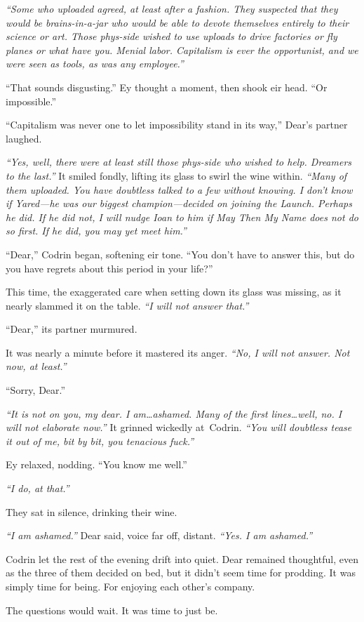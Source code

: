 \emph{``Some who uploaded agreed, at least after a fashion. They suspected that they would be brains-in-a-jar who would be able to devote themselves entirely to their science or art. Those phys-side wished to use uploads to drive factories or fly planes or what have you. Menial labor. Capitalism is ever the opportunist, and we were seen as tools, as was any employee.''}

``That sounds disgusting.'' Ey thought a moment, then shook eir head. ``Or impossible.''

``Capitalism was never one to let impossibility stand in its way,'' Dear's partner laughed.

\emph{``Yes, well, there were at least still those phys-side who wished to help. Dreamers to the last.''} It smiled fondly, lifting its glass to swirl the wine within. \emph{``Many of them uploaded. You have doubtless talked to a few without knowing. I don't know if Yared---he was our biggest champion---decided on joining the Launch. Perhaps he did. If he did not, I will nudge Ioan to him if May Then My Name does not do so first. If he did, you may yet meet him.''}

``Dear,'' Codrin began, softening eir tone. ``You don't have to answer this, but do you have regrets about this period in your life?''

This time, the exaggerated care when setting down its glass was missing, as it nearly slammed it on the table. \emph{``I will not answer that.''}

``Dear,'' its partner murmured.

It was nearly a minute before it mastered its anger. \emph{``No, I will not answer. Not now, at least.''}

``Sorry, Dear.''

\emph{``It is not on you, my dear. I am\ldots ashamed. Many of the first lines\ldots well, no. I will not elaborate now.''} It grinned wickedly at\pagebreak\ Codrin. \emph{``You will doubtless tease it out of me, bit by bit, you tenacious fuck.''}

Ey relaxed, nodding. ``You know me well.''

\emph{``I do, at that.''}

They sat in silence, drinking their wine.

\emph{``I am ashamed.''} Dear said, voice far off, distant. \emph{``Yes. I am ashamed.''}

Codrin let the rest of the evening drift into quiet. Dear remained thoughtful, even as the three of them decided on bed, but it didn't seem time for prodding. It was simply time for being. For enjoying each other's company.

The questions would wait. It was time to just be.
